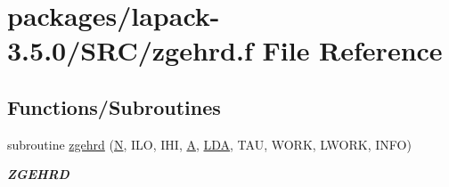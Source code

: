 \hypertarget{zgehrd_8f}{}\section{packages/lapack-\/3.5.0/\+S\+R\+C/zgehrd.f File Reference}
\label{zgehrd_8f}
\subsection*{Functions/\+Subroutines}
\begin{DoxyCompactItemize}
\item 
subroutine \hyperlink{group__complex16GEcomputational_ga4de4b424a4c7b0a78f7138a94ec54671}{zgehrd} (\hyperlink{polmisc_8c_a0240ac851181b84ac374872dc5434ee4}{N}, I\+L\+O, I\+H\+I, \hyperlink{classA}{A}, \hyperlink{example__user_8c_ae946da542ce0db94dced19b2ecefd1aa}{L\+D\+A}, T\+A\+U, W\+O\+R\+K, L\+W\+O\+R\+K, I\+N\+F\+O)
\begin{DoxyCompactList}\small\item\em {\bfseries Z\+G\+E\+H\+R\+D} \end{DoxyCompactList}\end{DoxyCompactItemize}
